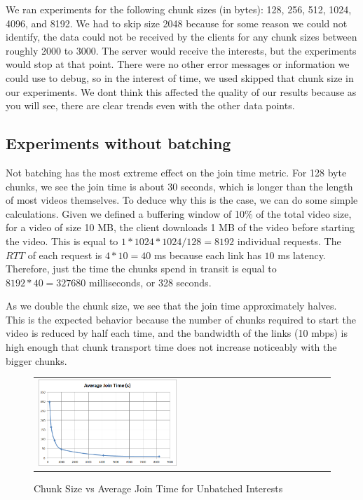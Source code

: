 We ran experiments for the following chunk sizes (in bytes): 128, 256, 512,
1024, 4096, and 8192. We had to skip size 2048 because for some reason
we could not identify, the data could not be received by the clients for any
chunk sizes between roughly 2000 to 3000. The server would receive the
interests, but the experiments would stop at that point. There were no other
error messages or information we could use to debug, so in the interest of time,
we used skipped that chunk size in our experiments. We dont think this affected
the quality of our results because as you will see, there are clear trends even
with the other data points.


\subsection{Experiments without batching} \label{sec:nobatch}

Not batching has the most extreme effect on the join time metric. For 128 byte
chunks, we see the join time is about 30 seconds, which is longer than the
length of most videos themselves. To deduce why this is the case, we can do some
simple calculations. Given we defined a buffering window of 10\% of the total
video size, for a video of size 10 MB, the client downloads 1 MB of the video
before starting the video. This is equal to $1 * 1024 * 1024 / 128 = 8192$
individual requests. The $RTT$ of each request is $4 * 10 = 40$ ms because
each link has $10$ ms latency. Therefore, just the time the chunks spend in
transit is equal to $8192 * 40 = 327680$ milliseconds, or 328 seconds.

As we double the chunk size, we see that the join time approximately halves.
This is the expected behavior because the number of chunks required to start the
video is reduced by half each time, and the bandwidth of the links (10 mbps) is
high enough that chunk transport time does not increase noticeably with the
bigger chunks.

\begin{figure}[h]
    \begin{center}
        \begin{tabular}{l}
            \includegraphics[width=0.48\textwidth]{fig/join_nobatch.png}
            \\
        \end{tabular}
        \caption{Chunk Size vs Average Join Time for Unbatched Interests}
        \label{fig:joinnobatch}
    \end{center}
\end{figure}

